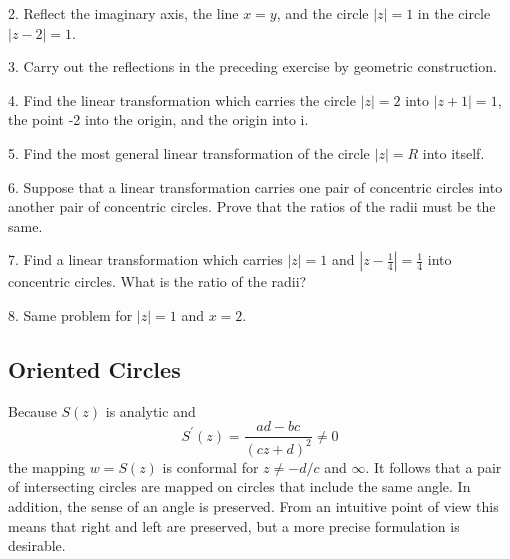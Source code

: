2. Reflect the imaginary axis, the line $x = y$, and the circle $|z| = 1$ in the circle $|z - 2| = 1$.

3. Carry out the reflections in the preceding exercise by geometric construction.

4. Find the linear transformation which carries the circle $|z| = 2$ into $|z + 1| = 1$, the point -2 into the origin, and the origin into i.

5. Find the most general linear transformation of the circle $|z| = R$ into itself.

6. Suppose that a linear transformation carries one pair of concentric circles into another pair of concentric circles. Prove that the ratios of the radii must be the same.

7. Find a linear transformation which carries $|z| = 1$ and $|z - \frac{1}{4}| = \frac{1}{4}$ into concentric circles. What is the ratio of the radii?

8. Same problem for $|z| = 1$ and $x = 2$.

\setcounter{section}{3}\setcounter{subsection}{3}\subsection{Oriented Circles}\label{sec:3.3.4}
Because $S(z)$ is analytic and
\begin{equation*}
S ^ {\prime} (z) = \frac {a d - b c}{(c z + d) ^ {2}} \neq 0
\end{equation*}
the mapping $w = S(z)$ is conformal for $z \neq -d/c$ and $\infty$. It follows that a pair of intersecting circles are mapped on circles that include the same angle. In addition, the sense of an angle is preserved. From an intuitive point of view this means that right and left are preserved, but a more precise formulation is desirable.


